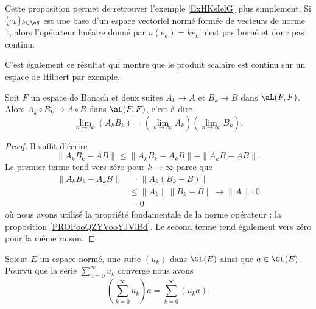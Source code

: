 \begin{remark}  \label{RemOAXNooSMTDuN}
Cette proposition permet de retrouver l'exemple \ref{ExHKsIelG} plus simplement. Si \( \{ e_k \}_{k\in \eN}\) est une base d'un espace vectoriel normé formée de vecteurs de norme \( 1\), alors l'opérateur linéaire donné par \( u(e_k)=ke_k\) n'est pas borné et donc pas continu.
\end{remark}

C'est également ce résultat qui montre que le produit scalaire est continu sur un espace de Hilbert par exemple.

\begin{lemma}   \label{LemWWXVSae}
Soit \( F\) un espace de Banach et deux suites \( A_k\to A\) et \( B_k\to B\) dans \( \aL(F,F)\). Alors \( A_k\circ B_k\to A\circ B\) dans \( \aL(F,F)\), c'est à dire
\begin{equation}
    \lim_{n\to \infty} (A_kB_k)=\left( \lim_{n\to \infty} A_k \right)\left( \lim_{n\to \infty} B_k \right).
\end{equation}
\end{lemma}

\begin{proof}
    Il suffit d'écrire
    \begin{equation}
        \| A_kB_k-AB \|\leq \| A_kB_k-A_kB \|+\| A_kB-AB \|.
    \end{equation}
    Le premier terme tend vers zéro pour \( k\to\infty\) parce que 
    \begin{subequations}
        \begin{align}
            \| A_kB_k-A_kB \|&=\| A_k(B_k-B) \|\\
            &\leq \| A_k \|\| B_k-B \|\to \| A \|\cdot 0\\
            &=0
        \end{align}
    \end{subequations}
    où nous avons utilisé la propriété fondamentale de la norme opérateur : la proposition \ref{PROPooQZYVooYJVlBd}. Le second terme tend également vers zéro pour la même raison.
\end{proof}

\begin{proposition} \label{PropQXqEPuG}
    Soient \( E\) un espace normé, une suite \( (u_k)\) dans \( \GL(E)\) ainsi que \( a\in\GL(E)\). Pourvu que la série \( \sum_{n=0}^{\infty}u_k\) converge nous avons
    \begin{equation}
        \left( \sum_{k=0}^{\infty}u_k \right)a=\sum_{k=0}^{\infty}(u_ka).
    \end{equation}
\end{proposition}

